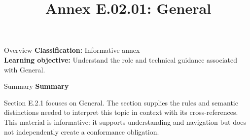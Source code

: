 \documentclass[10pt,letterpaper]{article}
\title{Annex E.02.01: General}
\author{}
\date{}
\begin{document}
\maketitle
\begin{CornellOverviewBox}{Overview}
\textbf{Classification:} Informative annex\\[2pt]
\textbf{Learning objective:} Understand the role and technical guidance associated with General.
\end{CornellOverviewBox}\begin{CornellSummaryBox}{Summary}
{\sffamily\bfseries\color{Accent} Summary}\par\vspace{3pt}Section E.2.1 focuses on General. The section supplies the rules and semantic distinctions needed to interpret this topic in context with its cross-references. This material is informative: it supports understanding and navigation but does not independently create a conformance obligation.
\end{CornellSummaryBox}
\end{document}

